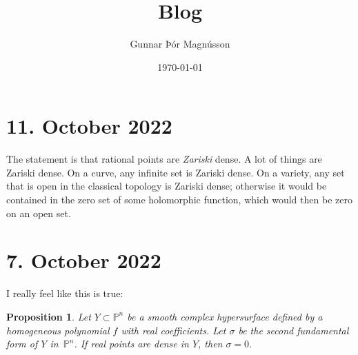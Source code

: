 \documentclass[11pt]{article}
\author{Gunnar Þór Magnússon}
\date{\today}
\title{Blog}
\newtheorem{prop}[theo]{Proposition}
\theoremstyle{definition}
\newcommand{\kk}[1]{\mathbb{#1}}
\begin{document}
\maketitle

\section{11. October 2022}

The statement is that rational points are \emph{Zariski} dense.
A lot of things are Zariski dense.
On a curve, any infinite set is Zariski dense.
On a variety, any set that is open in the classical topology is Zariski dense;
otherwise it would be contained in the zero set of some holomorphic function,
which would then be zero on an open set.


\section{7. October 2022}


I really feel like this is true:


\begin{prop}
Let $Y \subset \kk P^{n}$ be a smooth complex hypersurface defined by a homogeneous polynomial  $f$ with real coefficients.
Let $\sigma$ be the second fundamental form of $Y$ in~$\kk P^{n}$.
If real points are dense in $Y$, then $\sigma = 0$.
\end{prop}
\end{document}
